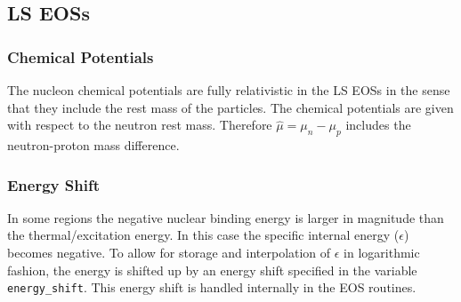 \documentclass[10pt,nofootinbib]{article}
\newcommand{\code}[1]{\texttt{#1}}
\begin{document}
\subsection{LS EOSs}

\subsubsection{Chemical Potentials}
The nucleon chemical potentials are fully relativistic in the LS EOSs
 in the sense that they include the rest mass of the particles.  The
 chemical potentials are given with respect to the neutron rest mass.
 Therefore $\hat{\mu} = \mu_n-\mu_p$ includes the neutron-proton mass
 difference.

\subsubsection{Energy Shift}
In some regions the negative nuclear binding energy is larger in
magnitude than the thermal/excitation energy. In this case the
specific internal energy ($\epsilon$) becomes negative. To allow for storage
and interpolation of $\epsilon$ in logarithmic fashion, the energy is shifted
up by an energy shift specified in the variable \code{energy\_shift}. This
energy shift is handled internally in the EOS routines.
\end{document}
